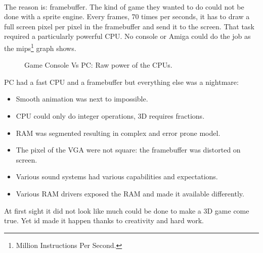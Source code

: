 \\
The reason is: framebuffer. The kind of game they wanted to do could not be done with a sprite engine. Every frames, 70 times per seconds, it has to draw a full screen pixel per pixel in the framebuffer and send it to the screen. That task required a particularly powerful CPU. No console or Amiga could do the job as the mips\footnote{Million Instructions Per Second.} graph shows.
\\
\begin{figure}[H]
\centering
   \caption{Game Console Vs PC: Raw power of the CPUs.} \label{fig:game_console_vs_PC}
 \end{figure}
 
PC had a fast CPU and a framebuffer but everything else was a nightmare:
\begin{itemize}
\item Smooth animation was next to impossible.
\item CPU could only do integer operations, 3D requires fractions.
\item RAM was segmented resulting in complex and error prone model.
\item The pixel of the VGA were not square: the framebuffer was distorted on screen.
\item Various sound systems had various capabilities and expectations.
\item Various RAM drivers exposed the RAM and made it available differently.
\end{itemize}

At first sight it did not look like much could be done to make a 3D game come true. Yet id made it happen thanks to creativity and hard work.

